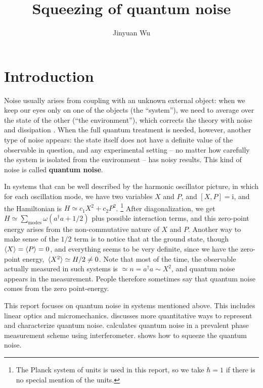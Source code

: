 \documentclass[hyperref, a4paper]{article}
\title{Squeezing of quantum noise}
\author{Jinyuan Wu}
\newcommand*{\ii}{\mathrm{i}}
\newcommand*{\concept}[1]{{\textbf{#1}}}
\begin{document}
    
\maketitle

\section{Introduction}

Noise usually arises from coupling with an unknown external object:
when we keep our eyes only on one of the objects (the ``system''),
we need to average over the state of the other (``the environment''),
which corrects the theory with noise and dissipation \cite{zwanzig_nonequilibrium_2001}.
When the full quantum treatment is needed,
however, another type of noise appears:
the state itself does not have a definite value of the observable in question, 
and any experimental setting 
-- no matter how carefully the system is isolated from the environment -- 
has noisy results.
This kind of noise is called \concept{quantum noise}.

In systems that can be well described by 
the harmonic oscillator picture,
in which for each oscillation mode, 
we have two variables $X$ and $P$, and $[X, P] = \ii$,
and the Hamiltonian is $H \simeq c_1 X^2 + c_2 P^2$.%
\footnote{
    The Planck system of units is used in this report, 
    so we take $\hbar = 1$ if there is no special mention of the units.
}
After diagonalization, we get $H \simeq \sum_{\text{modes}} \omega (a^\dagger a + 1/2)$ 
plus possible interaction terms,
and this zero-point energy arises from the non-commutative nature of $X$ and $P$.
Another way to make sense of the $1/2$ term is to notice that at the ground state,
though $\expval{X} = \expval{P} = 0$,
and everything seems to be very definite,
since we have the zero-point energy,
$\expval*{X^2} \simeq H / 2 \neq 0$.
Note that most of the time, the observable actually measured in such systems 
is $\simeq n = a^\dagger a \sim X^2$,
and quantum noise appears in the measurement.
People therefore sometimes say that 
quantum noise comes from the zero point-energy.


This report focuses on quantum noise in systems mentioned above.
This includes linear optics and micromechanics.
 discusses more quantitative ways to represent and characterize quantum noise.
 calculates quantum noise 
in a prevalent phase measurement scheme using interferometer.
 shows how to squeeze the quantum noise.
\end{document}
